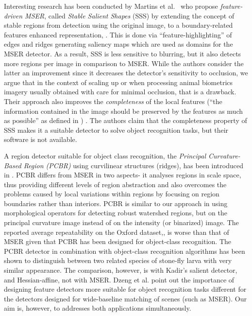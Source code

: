 \documentclass[conference,compsoc]{IEEEtran}
\begin{document}
Interesting research has been conducted by Martins et al.~ who propose {\em feature-driven MSER}, called  {\em Stable Salient Shapes} (SSS) by extending the concept of stable regions from detection using the original image, to a boundary-related features enhanced representation, \cite{MartinsVisapp12, Martins12}. This is done via ``feature-highlighting'' of edges and ridges generating saliency maps which are used as domains for the MSER detector. As a result, SSS is less sensitive to blurring, but it also detects more regions per image in comparison to MSER. While the authors consider the latter an improvement since it decreases the detector's sensitivity to occlusion, we argue that in the context of scaling up or when processing animal biometrics imagery usually obtained with care for minimal occlusion, that is a drawback. Their approach also improves the {\em completeness} of the local features (``the information contained in the image should be preserved by the features as much as possible'' as defined in \cite{Dickscheid2011}) \cite{Martins2016OnTC}. The authors claim that the completeness property of SSS makes it a suitable detector to solve object recognition tasks, but their software is not available.

A region detector suitable for object class recognition, the {\em Principal Curvature-Based Region (PCBR)} using curvilinear structures (ridges), has been introduced in \cite{DengZMDS07}. PCBR differs from MSER in two aspects- it analyses regions in scale space, thus providing different levels of region abstraction and also overcomes the problems caused by local variations within regions by focusing on region boundaries rather than interiors. PCBR is similar to our approach in using morphological operators for detecting robust watershed regions, but on the principal curvature image instead of on the intensity (or binarized) image. The reported average repeatability on the Oxford dataset,\cite{Mikolajczyk:2005}, is worse than that of MSER given that PCBR has been designed for object-class recognition. The PCBR detector in combination with object-class recognition algorithms has been shown to distinguish between two related species of stone-fly larva with very similar appearance. The comparison, however, is with Kadir's salient detector, \cite{Kadir2004} and Hessian-affine, not with MSER.  Dzeng et al. point out the importance of designing feature detectors more suitable for object recognition tasks different for the detectors designed for wide-baseline matching of scenes (such as MSER). Our aim is, however, to addresses both applications simultaneously.
\end{document}
